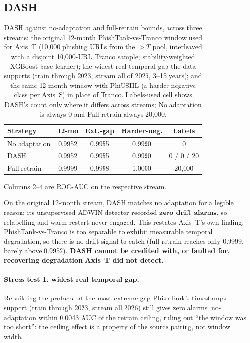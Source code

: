 \documentclass[conference]{IEEEtran}
\begin{document}
\subsection{DASH}

\begin{table}[t]
\caption{DASH against no-adaptation and full-retrain bounds, across
three streams: the original 12-month PhishTank-vs-Tranco window used for
Axis~T (10{,}000 phishing URLs from the $>T$ pool, interleaved with a
disjoint 10{,}000-URL Tranco sample; stability-weighted XGBoost base
learner); the widest real temporal gap the data supports (train through
2023, stream all of 2026, 3--15 years); and the same 12-month window with PhiUSIIL (a harder negative class per
Axis~S) in place of Tranco.
Labels-used cell shows DASH's count only where it differs across
streams; No adaptation is always 0 and Full retrain always 20{,}000.}
\label{tab:dash}
\centering\scriptsize
\setlength{\tabcolsep}{2.5pt}
\begin{tabular}{@{}lcccc@{}}
\toprule
\textbf{Strategy} & \textbf{12-mo} & \textbf{Ext.-gap} & \textbf{Harder-neg.} & \textbf{Labels}\\
\midrule
No adaptation & 0.9952 & 0.9955 & 0.9990 & 0\\
DASH          & 0.9952 & 0.9955 & 0.9990 & 0 / 0 / 20\\
Full retrain  & 0.9999 & 0.9998 & 1.0000 & 20{,}000\\
\bottomrule
\end{tabular}
\vspace{2pt}
\raggedright\scriptsize
Columns 2--4 are ROC-AUC on the respective stream.
\end{table}

On the original 12-month stream, DASH matches no adaptation for a
legible reason: its unsupervised ADWIN detector recorded \textbf{zero
drift alarms}, so relabelling and warm-restart never engaged. This restates Axis~T's own
finding: PhishTank-vs-Tranco is too separable to
exhibit measurable temporal degradation, so there is no drift signal to
catch (full retrain reaches only 0.9999, barely above 0.9952).
\textbf{DASH cannot be credited with, or faulted for, recovering
degradation Axis~T did not detect.}

\paragraph{Stress test 1: widest real temporal gap.} Rebuilding the
protocol at the most extreme gap PhishTank's timestamps support (train
through 2023, stream all 2026) still gives zero alarms, no-adaptation within 0.0043 AUC of the retrain ceiling, ruling out ``the
window was too short'': the ceiling effect is a property of the source pairing, not
window width.
\end{document}
